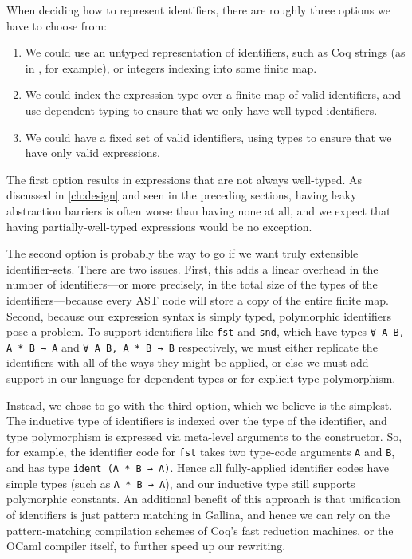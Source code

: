 When deciding how to represent identifiers, there are roughly three options we have to choose from:
\begin{enumerate}
\item
  We could use an untyped representation of identifiers, such as Coq strings (as in \textcite{TemplateCoq}, for example), or integers indexing into some finite map.
\item
  We could index the expression type over a finite map of valid identifiers, and use dependent typing to ensure that we only have well-typed identifiers.
\item
  We could have a fixed set of valid identifiers, using types to ensure that we have only valid expressions.
\end{enumerate}

The first option results in expressions that are not always well-typed.
As discussed in \autoref{ch:design} and seen in the preceding sections, having leaky abstraction barriers is often worse than having none at all, and we expect that having partially-well-typed expressions would be no exception.

The second option is probably the way to go if we want truly extensible identifier-sets.
There are two issues.
First, this adds a linear overhead in the number of identifiers---or more precisely, in the total size of the types of the identifiers---because every AST node will store a copy of the entire finite map.
Second, because our expression syntax is simply typed, polymorphic identifiers pose a problem.
To support identifiers like \texttt{fst} and \texttt{snd}, which have types \texttt{∀ A B, A * B → A} and \texttt{∀ A B, A * B → B} respectively, we must either replicate the identifiers with all of the ways they might be applied, or else we must add support in our language for dependent types or for explicit type polymorphism.

Instead, we chose to go with the third option, which we believe is the simplest.
The inductive type of identifiers is indexed over the type of the identifier, and type polymorphism is expressed via meta-level arguments to the constructor.
So, for example, the identifier code for \texttt{fst} takes two type-code arguments \texttt{A} and \texttt{B}, and has type \texttt{ident (A * B → A)}.
Hence all fully-applied identifier codes have simple types (such as \texttt{A * B → A}), and our inductive type still supports polymorphic constants.
An additional benefit of this approach is that unification of identifiers is just pattern matching in Gallina, and hence we can rely on the pattern-matching compilation schemes of Coq's fast reduction machines, or the OCaml compiler itself, to further speed up our rewriting.

